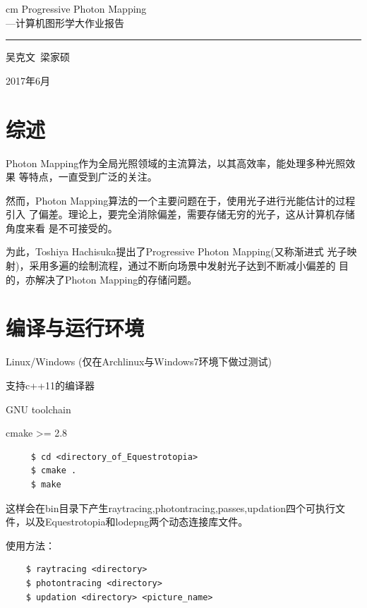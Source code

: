 \documentclass[a4paper,12pt]{article}
\theoremstyle{plain}
\numberwithin{thmdef}{section}
\begin{document}
\begin{titlepage}
    \mbox{}
     cm
    \centering
    \Huge Progressive Photon Mapping\\ \huge ---计算机图形学大作业报告

    \rule{\textwidth}{1pt}\par %

    \Large 吴克文\ 梁家硕

    \large 2017年6月
\end{titlepage}
\tableofcontents
\newpage
\section{综述}
Photon Mapping作为全局光照领域的主流算法，以其高效率，能处理多种光照效果%
等特点，一直受到广泛的关注。\par
然而，Photon Mapping算法的一个主要问题在于，使用光子进行光能估计的过程引入%
了偏差。理论上，要完全消除偏差，需要存储无穷的光子，这从计算机存储角度来看%
是不可接受的。\par
为此，Toshiya Hachisuka提出了Progressive Photon Mapping(又称渐进式%
光子映射)，采用多遍的绘制流程，通过不断向场景中发射光子达到不断减小偏差的%
目的，亦解决了Photon Mapping的存储问题。
\section{编译与运行环境}
Linux/Windows (仅在Archlinux与Windows7环境下做过测试)\par
支持c++11的编译器\par
GNU toolchain\par
cmake >= 2.8\par
\begin{verbatim}
     $ cd <directory_of_Equestrotopia>
     $ cmake .
     $ make 
\end{verbatim}

这样会在bin目录下产生raytracing,photontracing,passes,updation四个可执行文件，以及Equestrotopia和lodepng两个动态连接库文件。\par
使用方法：
\begin{verbatim}
    $ raytracing <directory>
    $ photontracing <directory>
    $ updation <directory> <picture_name>
\end{verbatim}
\end{document}
